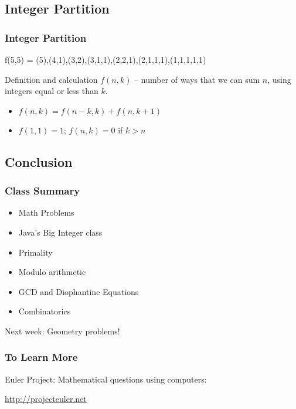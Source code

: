 \documentclass{beamer}
\begin{document}
\subsection{Integer Partition}
\begin{frame}
  \frametitle{Integer Partition}
  \begin{block}{}
    f(5,5) = (5),(4,1),(3,2),(3,1,1),(2,2,1),(2,1,1,1),(1,1,1,1,1)
  \end{block}
  \begin{block}{Definition and calculation}
    $f(n,k)$ -- number of ways that we can sum $n$, using integers
    equal or less than $k$.

    \bigskip

    \begin{itemize}
    \item $f(n,k) = f(n-k,k) + f(n, k+1)$
    \item $f(1,1) = 1$; $f(n,k) = 0$ if $k > n$ 
    \end{itemize}
  \end{block}
\end{frame}




\subsection{Conclusion}
\begin{frame}
  \frametitle{Class Summary}
  \begin{itemize}
  \item Math Problems
  \item Java's Big Integer class
  \item Primality
  \item Modulo arithmetic
  \item GCD and Diophantine Equations
  \item Combinatorics
  \end{itemize}

  \begin{block}{}
    Next week: Geometry problems!
  \end{block}
\end{frame}



\begin{frame}
  \frametitle{To Learn More}

  Euler Project: Mathematical questions using computers:

  \url{http://projecteuler.net}
\end{frame}
\end{document}
